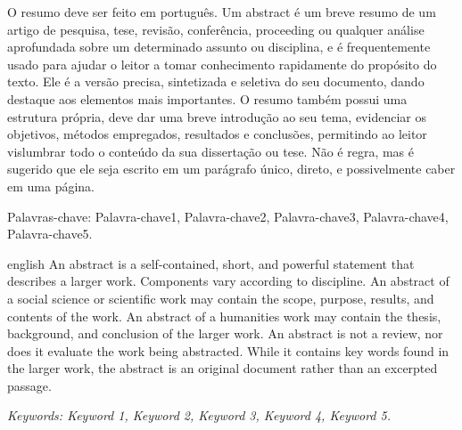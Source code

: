 \documentclass[
	12pt,				%
	twoside,			%
	a4paper,			%
	chapter=TITLE,		%
	section=TITLE,		%
	subsection=TITLE,	%
	subsubsection=TITLE,%
	english,			%
	french,				%
	spanish,			%
	brazil,				%
	]{abntex2}
\begin{document}
\begin{resumo}
    O resumo deve ser feito em português. 
    Um abstract é um breve resumo de um artigo de pesquisa, tese, revisão, conferência, proceeding ou qualquer análise aprofundada sobre um determinado assunto ou disciplina, e é frequentemente usado para ajudar o leitor a tomar conhecimento rapidamente do propósito do texto.
    Ele é a versão precisa, sintetizada e seletiva do seu documento, dando destaque aos elementos mais importantes. O resumo também possui uma estrutura própria, deve dar uma breve introdução ao seu tema, evidenciar os objetivos, métodos empregados, resultados e conclusões, permitindo ao leitor vislumbrar todo o conteúdo da sua dissertação ou tese. Não é regra, mas é sugerido que ele seja escrito em um parágrafo único, direto, e possivelmente caber em uma página. 
    
        
    Palavras-chave: Palavra-chave1, Palavra-chave2, Palavra-chave3, Palavra-chave4, Palavra-chave5.

\end{resumo}

\begin{resumo}[Abstract]
    \begin{otherlanguage*}{english}
        An abstract is a self-contained, short, and powerful statement that describes a larger work. Components vary according to discipline. An abstract of a social science or scientific work may contain the scope, purpose, results, and contents of the work. An abstract of a humanities work may contain the thesis, background, and conclusion of the larger work. An abstract is not a review, nor does it evaluate the work being abstracted. While it contains key words found in the larger work, the abstract is an original document rather than an excerpted passage.

        \textit{Keywords: Keyword 1, Keyword 2, Keyword 3, Keyword 4, Keyword 5.}
    \end{otherlanguage*}
\end{resumo}

\listoffigures*
\cleardoublepage

\listoftables*
\cleardoublepage


\cleardoublepage
\end{document}
